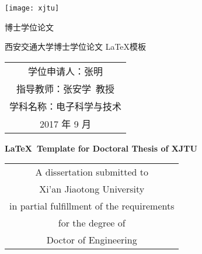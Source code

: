
\begin{titlepage}
	\begin{center}
		\begin{figure*}[!ht]\vspace{5em}
			\centering
			\texttt{[image: xjtu]}
		\end{figure*}
		
		\vspace{1.5em}
		\begin{center} {\erhao 博士学位论文}\end{center}
		
		\vspace{8.5em}
		\begin{center} {\sanhao\hei 西安交通大学博士学位论文 \LaTeX 模板}\end{center}
		
		\vspace{16em}
		{\sanhao
			\begin{center} \renewcommand{\arraystretch}{1.75}
				\begin{tabular}{c}
					学位申请人：张明 \\
					指导教师：张安学~教授 \\
					学科名称：电子科学与技术 \\
					2017 年 9 月 \\
				\end{tabular} \renewcommand{\arraystretch}{1}
			\end{center} 
		}
	\end{center}
	\clearpage{\pagestyle{empty}\cleardoublepage}
	
	\newpage\thispagestyle{empty}
	\begin{center}
		\parbox[t][0.7cm][t]{\textwidth}{}
		
		\begin{center}{\sanhao\bfseries \LaTeX~Template for Doctoral Thesis of XJTU}\end{center}
		
		\vspace{4.7cm}
		{\sanhao
			\begin{center} \renewcommand{\arraystretch}{1.4}
				\begin{tabular}{c}
					A dissertation submitted to  \\
					Xi'an Jiaotong University \\
					in partial fulfillment of the requirements \\
					for the degree of \\
					Doctor of Engineering \\
				\end{tabular} \renewcommand{\arraystretch}{1}
			\end{center} 
		}
			

\end{center}
\end{titlepage}
